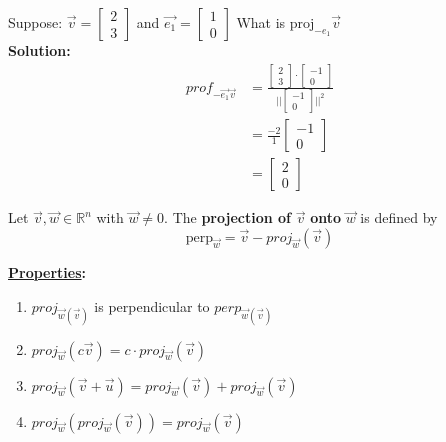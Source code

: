 \documentclass[11pt]{article}
\theoremstyle{plain}
\theoremstyle{remark}
\theoremstyle{plain}
\newcommand{\bd}{\textbf}
\newcommand{\rn}{\mathbb{R}}
\begin{document}
\begin{tcolorbox}[colback=magenta!5!white,colframe=magenta!75!black,title=Example]
    Suppose: $\overrightarrow{v} = \begin{bmatrix}
        2 \\3
    \end{bmatrix}$ and $\overrightarrow{e_1} = \begin{bmatrix}
        1\\0
    \end{bmatrix}$ What is $\text{proj}_{-e_1}\overrightarrow{v}$\\

    \bd{Solution:}
    \begin{align*}
        prof_{-\overrightarrow{e_1}\overrightarrow{v}} &= \frac{\begin{bmatrix}
            2\\3
        \end{bmatrix}\cdot \begin{bmatrix}
            -1\\0
        \end{bmatrix}}{||\begin{bmatrix}
            -1 \\0 
        \end{bmatrix} ||^2} \\
        &=\frac{-2}{1}\begin{bmatrix}
            -1\\0
        \end{bmatrix} \\
        &=\begin{bmatrix}
            2\\0
        \end{bmatrix}
    \end{align*}
\end{tcolorbox}   

\begin{tcolorbox}[colback=green!5!white,colframe=green!75!black,title=Definition]
    Let $\overrightarrow{v}, \overrightarrow{w}\in\rn^n$ with $\overrightarrow{w}\neq 0$. The \bd{projection of} $\overrightarrow{v}$ \bd{onto} 
    $\overrightarrow{w}$ is defined by
    \[\text{perp}_{\overrightarrow{w}} = \overrightarrow{v} - proj_{\overrightarrow{w}}(\overrightarrow{v})\] 
\end{tcolorbox}  

\bd{\underline{Properties}:}
\begin{enumerate}
    \item $proj_{\overrightarrow{w}(\overrightarrow{v})}$ is perpendicular to $perp_{\overrightarrow{w}(\overrightarrow{v})}$
    \item $proj_{\overrightarrow{w}}(c\overrightarrow{v}) = c\cdot proj_{\overrightarrow{w}}(\overrightarrow{v})$
    \item $proj_{\overrightarrow{w}}(\overrightarrow{v} + \overrightarrow{u}) = proj_{\overrightarrow{w}}(\overrightarrow{v}) + proj_{\overrightarrow{w}}(\overrightarrow{v})$
    \item $proj_{\overrightarrow{w}}(proj_{\overrightarrow{w}}(\overrightarrow{v})) = proj_{\overrightarrow{w}}(\overrightarrow{v})$ 
\end{enumerate} 
\end{document}
